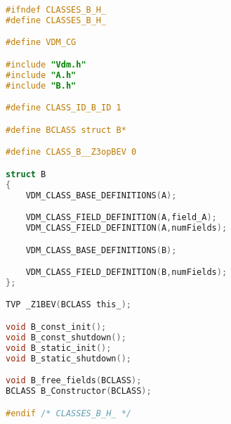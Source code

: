 %
%
%
\begin{lstlisting}[language=C,frame=tlbr,caption="File B.h."]
#ifndef CLASSES_B_H_
#define CLASSES_B_H_

#define VDM_CG

#include "Vdm.h"
#include "A.h"
#include "B.h"

#define CLASS_ID_B_ID 1

#define BCLASS struct B*

#define CLASS_B__Z3opBEV 0

struct B
{
	VDM_CLASS_BASE_DEFINITIONS(A);

	VDM_CLASS_FIELD_DEFINITION(A,field_A);
	VDM_CLASS_FIELD_DEFINITION(A,numFields);

	VDM_CLASS_BASE_DEFINITIONS(B);

	VDM_CLASS_FIELD_DEFINITION(B,numFields);
};

TVP _Z1BEV(BCLASS this_);

void B_const_init();
void B_const_shutdown();
void B_static_init();
void B_static_shutdown();

void B_free_fields(BCLASS);
BCLASS B_Constructor(BCLASS);

#endif /* CLASSES_B_H_ */

\end{lstlisting}
%
%
%
